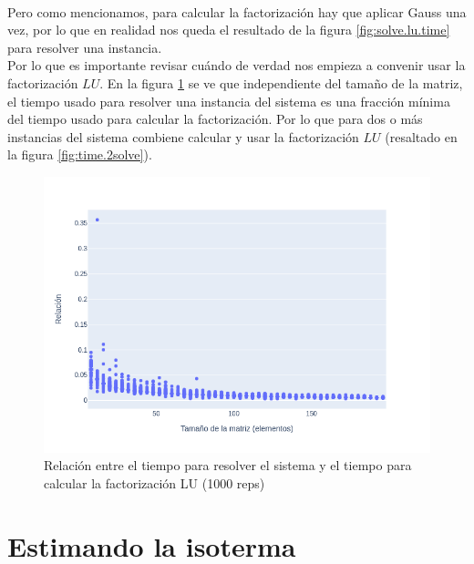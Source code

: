 \documentclass[12pt]{article}
\begin{document}
\paragraph{} Pero como mencionamos, para calcular la factorización hay que aplicar Gauss una vez, por lo que en realidad nos queda el resultado de la figura \ref{fig:solve.lu.time} para resolver una instancia. \\
Por lo que es importante revisar cuándo de verdad nos empieza a convenir usar la factorización \(LU\). En la figura \ref{fig:pct_lu.time} se ve que independiente del tamaño de la matriz, el tiempo usado para resolver una instancia del sistema es una fracción mínima del tiempo usado para calcular la factorización. Por lo que para dos o más instancias del sistema combiene calcular y usar la factorización \(LU\) (resaltado en la figura \ref{fig:time.2solve}).



\begin{figure}[H]
\centering
\includegraphics[width=\textwidth]{times.pct_lu.1000.1}
\caption{Relación entre el tiempo para resolver el sistema y el tiempo para calcular la factorización LU (1000 reps)}
\label{fig:pct_lu.time}
\end{figure}

\section{Estimando la isoterma}
\end{document}
